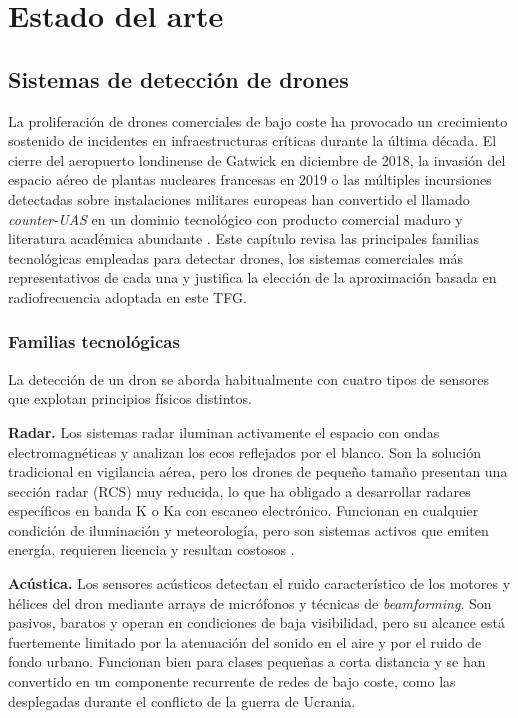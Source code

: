 \chapter{Estado del arte}
\label{cap:estado_arte}

\section{Sistemas de detección de drones}
\label{sec:deteccion_drones}

La proliferación de drones comerciales de bajo coste ha provocado un crecimiento sostenido de incidentes en infraestructuras críticas durante la última década. El cierre del aeropuerto londinense de Gatwick en diciembre de 2018, la invasión del espacio aéreo de plantas nucleares francesas en 2019 o las múltiples incursiones detectadas sobre instalaciones militares europeas han convertido el llamado \emph{counter-UAS}  en un dominio tecnológico con producto comercial maduro y literatura académica abundante \cite{taha2022counteruav,shi2025airport}. Este capítulo revisa las principales familias tecnológicas empleadas para detectar drones, los sistemas comerciales más representativos de cada una y justifica la elección de la aproximación basada en radiofrecuencia adoptada en este TFG.

\subsection{Familias tecnológicas}
\label{subsec:familias_deteccion}

La detección de un dron se aborda habitualmente con cuatro tipos de sensores que explotan principios físicos distintos.

\textbf{Radar.} Los sistemas radar iluminan activamente el espacio con ondas electromagnéticas y analizan los ecos reflejados por el blanco. Son la solución tradicional en vigilancia aérea, pero los drones de pequeño tamaño  presentan una sección radar (RCS) muy reducida, lo que ha obligado a desarrollar radares específicos en banda K o Ka con escaneo electrónico. Funcionan en cualquier condición de iluminación y meteorología, pero son sistemas activos que emiten energía, requieren licencia y resultan costosos \cite{taha2022counteruav}.

\textbf{Acústica.} Los sensores acústicos detectan el ruido característico de los motores y hélices del dron mediante arrays de micrófonos y técnicas de \emph{beamforming}. Son pasivos, baratos y operan en condiciones de baja visibilidad, pero su alcance está fuertemente limitado por la atenuación del sonido en el aire y por el ruido de fondo urbano. Funcionan bien para clases pequeñas a corta distancia  y se han convertido en un componente recurrente de redes de bajo coste, como las desplegadas durante el conflicto de la guerra de Ucrania.

